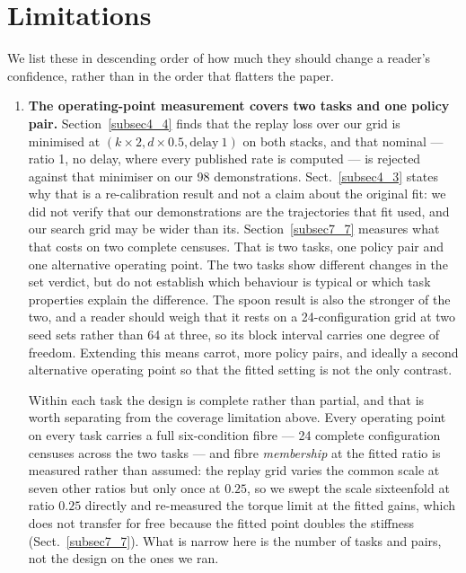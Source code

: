 \documentclass[pdflatex,iicol,sn-apa]{sn-jnl}
\theoremstyle{remark}
\begin{document}
\section{Limitations}\label{sec9}

We list these in descending order of how much they should change a reader's confidence, rather than
in the order that flatters the paper.

\begin{enumerate}
\item \textbf{The operating-point measurement covers two tasks and one policy pair.}
Section~\ref{subsec4_4} finds that the replay loss over our grid is minimised at
$(k{\times}2, d{\times}0.5, \text{delay}\ 1)$ on both stacks, and that nominal --- ratio 1, no delay,
where every published rate is computed --- is rejected against that minimiser on our 98
demonstrations. Sect.~\ref{subsec4_3} states why that is a re-calibration result and not a claim
about the original fit: we did not verify that our demonstrations are the trajectories that fit
used, and our search grid may be wider than its.
Section~\ref{subsec7_7} measures what that costs on two complete censuses. That is two tasks, one
policy pair and one alternative operating point. The two tasks show different changes in the set
verdict, but do not establish which behaviour is typical or which task properties explain the
difference. The spoon result is also the stronger
of the two, and a reader should weigh that it rests on a 24-configuration grid at two seed sets
rather than 64 at three, so its block interval carries one degree of freedom. Extending this means
carrot, more policy pairs, and ideally a second alternative operating point so that the fitted
setting is not the only contrast.

Within each task the design is complete rather than partial, and that is worth separating from
the coverage limitation above. Every operating point on every task carries a full six-condition
fibre --- 24 complete configuration censuses across the two tasks --- and fibre \emph{membership} at
the fitted ratio is measured rather than assumed: the replay grid varies the common scale at seven
other ratios but only once at $0.25$, so we swept the scale sixteenfold at ratio $0.25$ directly and
re-measured the torque limit at the fitted gains, which does not transfer for free because the
fitted point doubles the stiffness (Sect.~\ref{subsec7_7}). What is narrow here is the number of
tasks and pairs, not the design on the ones we ran.


\end{enumerate}
\end{document}
